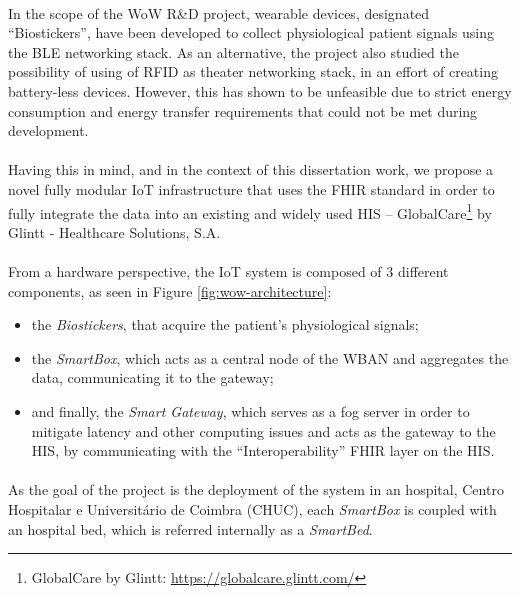 \paragraph{} In the scope of the \acs{WoW} R\&D project, wearable devices, designated ``Biostickers'', have been developed to collect physiological patient signals using the \acs{BLE} networking stack. As an alternative, the project also studied the possibility of using of \acs{RFID} as theater networking stack, in an effort of creating battery-less devices. However, this has shown to be unfeasible due to strict energy consumption and energy transfer requirements that could not be met during development. 

\paragraph{} Having this in mind, and in the context of this dissertation work, we propose a novel fully modular \acs{IoT} infrastructure that uses the \acs{FHIR} standard in order to fully integrate the data into an existing and widely used \acs{HIS} -- GlobalCare\footnote{GlobalCare by Glintt: \url{https://globalcare.glintt.com/}} by Glintt - Healthcare Solutions, S.A. 

\paragraph{} From a hardware perspective, the \acs{IoT} system is composed of 3 different components, as seen in Figure \ref{fig:wow-architecture}:
\begin{itemize}
    \item the \textit{Biostickers}, that acquire the patient's physiological signals;
    \item the \textit{SmartBox}, which acts as a central node of the \acs{WBAN} and aggregates the data, communicating it to the gateway;
    \item and finally, the \textit{Smart Gateway}, which serves as a fog server in order to mitigate latency and other computing issues and acts as the gateway to the \acs{HIS}, by communicating with the ``Interoperability'' \acs{FHIR} layer on the \acs{HIS}.
\end{itemize}

\paragraph{} As the goal of the project is the deployment of the system in an hospital, Centro Hospitalar e Universitário de Coimbra (CHUC), each \textit{SmartBox} is coupled with an hospital bed, which is referred internally as a \textit{SmartBed}.

